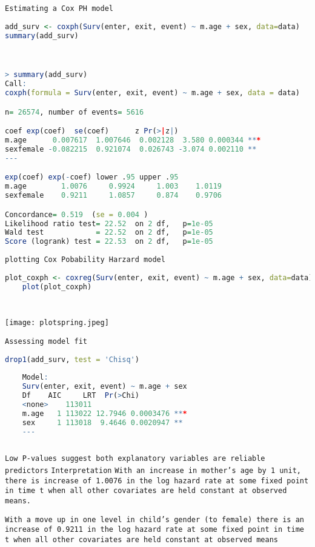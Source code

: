 \documentclass[12pt,letterpaper]{article}
\begin{document}
\vspace{2cm}
\texttt{Estimating a Cox PH model}
 \begin{lstlisting}[language=R]
add_surv <- coxph(Surv(enter, exit, event) ~ m.age + sex, data=data)
summary(add_surv)



> summary(add_surv)
Call:
coxph(formula = Surv(enter, exit, event) ~ m.age + sex, data = data)

n= 26574, number of events= 5616 

coef exp(coef)  se(coef)      z Pr(>|z|)    
m.age      0.007617  1.007646  0.002128  3.580 0.000344 ***
sexfemale -0.082215  0.921074  0.026743 -3.074 0.002110 ** 
---

exp(coef) exp(-coef) lower .95 upper .95
m.age        1.0076     0.9924     1.003    1.0119
sexfemale    0.9211     1.0857     0.874    0.9706

Concordance= 0.519  (se = 0.004 )
Likelihood ratio test= 22.52  on 2 df,   p=1e-05
Wald test            = 22.52  on 2 df,   p=1e-05
Score (logrank) test = 22.53  on 2 df,   p=1e-05
\end{lstlisting}



\vspace{2cm}
\texttt{plotting Cox Pobability Harzard model}
\begin{lstlisting}[language=R]
	plot_coxph <- coxreg(Surv(enter, exit, event) ~ m.age + sex, data=data)
	plot(plot_coxph)
	
	
\end{lstlisting}
\vspace{2cm}
\texttt{[image: plotspring.jpeg]}

\vspace{2cm}
\texttt{Assessing model fit}
\begin{lstlisting}[language=R]
	drop1(add_surv, test = 'Chisq')
	
	Model:
	Surv(enter, exit, event) ~ m.age + sex
	Df    AIC     LRT  Pr(>Chi)    
	<none>    113011                      
	m.age   1 113022 12.7946 0.0003476 ***
	sex     1 113018  9.4646 0.0020947 ** 
	---
	
\end{lstlisting}

\vspace{1cm}
\texttt{Low P-values suggest both explanatory variables are reliable predictors}
\vspace{2cm}\newline
 \texttt{Interpretation}
 \vspace{2cm}
\newline\texttt{With an increase in mother's age by 1 unit, there is increase of 1.0076 in the log hazard rate at some fixed point in time t when all other covariates are held constant at observed means. }

\vspace{2cm}
\texttt{With a move up in one level in child's gender (to female) there is an increase of 0.9211 in the log hazard rate at some fixed point in time t when all other covariates are held constant at observed means}
\end{document}
